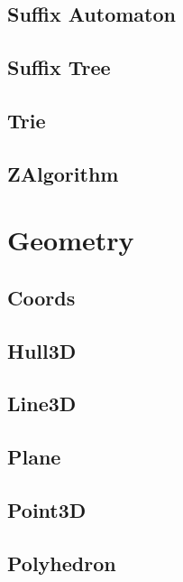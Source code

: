 \subsection{Suffix Automaton}
\raggedbottom
\hrulefill
\subsection{Suffix Tree}
\raggedbottom
\hrulefill
\subsection{Trie}
\raggedbottom
\hrulefill
\subsection{ZAlgorithm}
\raggedbottom
\hrulefill
\newpage

\section{Geometry}
\subsection{Coords}
\raggedbottom
\hrulefill
\subsection{Hull3D}
\raggedbottom
\hrulefill
\subsection{Line3D}
\raggedbottom
\hrulefill
\subsection{Plane}
\raggedbottom
\hrulefill
\subsection{Point3D}
\raggedbottom
\hrulefill
\subsection{Polyhedron}
\raggedbottom
\hrulefill
